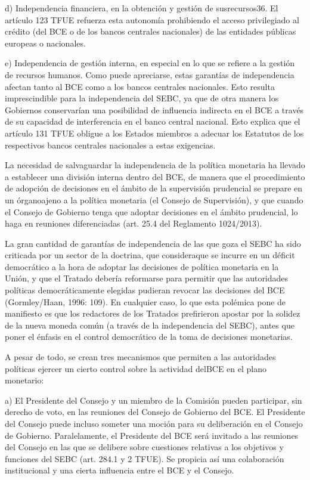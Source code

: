 \documentclass[10pt,a4paper]{article}
\begin{document}
d) Independencia financiera, en la obtención y gestión de susrecursos36. El artículo 123 TFUE refuerza esta autonomía prohibiendo el acceso privilegiado al crédito (del BCE o de los bancos centrales nacionales) de las entidades públicas europeas o nacionales.

e) Independencia de gestión interna, en especial en lo que se refiere a la gestión de recursos humanos. Como puede apreciarse, estas garantías de independencia afectan tanto al BCE como a los bancos centrales nacionales. Esto resulta imprescindible para la independencia del SEBC, ya que de otra manera los Gobiernos conservarían una posibilidad de influencia indirecta en el BCE a través de su capacidad de interferencia en el banco central nacional. Esto explica que el artículo 131 TFUE obligue a los Estados miembros a adecuar los Estatutos de los respectivos bancos centrales nacionales a estas exigencias.

La necesidad de salvaguardar la independencia de la política monetaria ha llevado a establecer una división interna dentro del BCE, de manera que el procedimiento de adopción de decisiones en el ámbito de la supervisión prudencial se prepare en un órganoajeno a la política monetaria (el Consejo de Supervisión), y que cuando el Consejo de Gobierno tenga que adoptar decisiones en el ámbito prudencial, lo haga en reuniones diferenciadas (art. 25.4 del Reglamento 1024/2013).

La gran cantidad de garantías de independencia de las que goza el SEBC ha sido criticada por un sector de la doctrina, que consideraque se incurre en un déficit democrático a la hora de adoptar las decisiones de política monetaria en la Unión, y que el Tratado debería reformarse para permitir que las autoridades políticas  democráticamente elegidas pudieran revocar las decisiones del BCE (Gormley/Haan, 1996: 109). En cualquier caso, lo que esta polémica pone de manifiesto es que los redactores de los Tratados prefirieron apostar por la solidez de la nueva moneda común (a través de la independencia del SEBC), antes que poner el énfasis en el control democrático de la toma de decisiones monetarias. 

A pesar de todo, se crean tres mecanismos que permiten a las autoridades políticas ejercer un cierto control sobre la actividad delBCE en el plano monetario:

a) El Presidente del Consejo y un miembro de la Comisión pueden participar, sin derecho de voto, en las reuniones del Consejo de Gobierno del BCE. El Presidente del Consejo puede incluso someter una moción para su deliberación en el Consejo de Gobierno. Paralelamente, el Presidente del BCE será invitado a las reuniones del Consejo en las que se delibere sobre cuestiones relativas a los objetivos y funciones del SEBC (art. 284.1 y 2 TFUE). Se propicia así una colaboración institucional y una cierta influencia entre el BCE y el Consejo.
\end{document}
